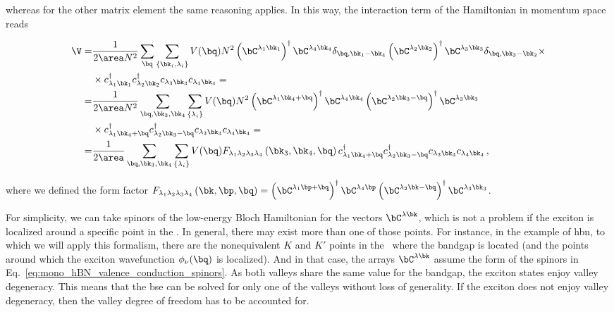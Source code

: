 \noindent whereas for the other matrix element the same reasoning applies.
In this way, the interaction term of the Hamiltonian in momentum space reads

\begin{align}
    \V  = & \frac{1}{2 \area N^{2}}\sum_{\bq}\sum_{\{\bk_{i},\lambda_{i}\}} V(\bq) N^{2} \left(\bC^{\lambda_1 \bk_1}\right)^{\dagger} \bC^{\lambda_4 \bk_4} \delta_{\bq,\bk_{1}-\bk_{4}} \left(\bC^{\lambda_2 \bk_2}\right)^{\dagger} \bC^{\lambda_3 \bk_3} \delta_{\bq,\bk_{3}-\bk_{2}} \times \\
          & \times  c^{\dagger}_{\lambda_1 \bk_1} c^{\dagger}_{\lambda_2 \bk_2} c_{\lambda_3 \bk_3} c_{\lambda_4 \bk_4} = \\
        = & \frac{1}{2 \area N^{2}}\sum_{\bq,\bk_{3},\bk_{4}} \sum_{\{\lambda_{i}\}}V(\bq) N^{2}\left(\bC^{\lambda_1 \bk_{4}+\bq}\right)^{\dagger} \bC^{\lambda_4 \bk_4}\left(\bC^{\lambda_2 \bk_{3}-\bq}\right)^{\dagger}\bC^{\lambda_3 \bk_3} \\
          & \times  c^{\dagger}_{\lambda_1 \bk_4 + \bq} c^{\dagger}_{\lambda_2 \bk_3 - \bq} c_{\lambda_3 \bk_3} c_{\lambda_4 \bk_4} = \\
        = & \frac{1}{2 \area}\sum_{\bq,\bk_{3},\bk_{4}}\sum_{\{\lambda_{i}\}} V(\bq) F_{\lambda_{1}\lambda_{2}\lambda_{3}\lambda_{4}}\left(\bk_{3},\bk_{4},\bq\right) c^{\dagger}_{\lambda_1 \bk_4 + \bq} c^{\dagger}_{\lambda_2 \bk_3 - \bq} c_{\lambda_3 \bk_3} c_{\lambda_4 \bk_4}\,,
\end{align}

\noindent where we defined the form factor $F_{\lambda_{1}\lambda_{2}\lambda_{3}\lambda_{4}} \left(\bk,\bp,\bq\right) = \left(\bC^{\lambda_{1} \bp+\bq}\right)^{\dagger}\bC^{\lambda_{4} \bp}\left(\bC^{\lambda_{2} \bk-\bq}\right)^{\dagger}\bC^{\lambda_3 \bk_{3}}$.

For simplicity, we can take spinors of the low-energy Bloch Hamiltonian for the vectors $\bC^{\lambda \bk}$, which is not a problem if the exciton is localized around a specific point in the \bz.
In general, there may exist more than one of those points.
For instance, in the example of \gls{hbn}, to which we will apply this formalism, there are the nonequivalent $K$ and $K'$ points in the \bz~where the bandgap is located (and the points around which the exciton wavefunction $\phi_{\nu} (\bq)$ is localized).
And in that case, the arrays $\bC^{\lambda \bk}$ assume the form of the spinors in Eq.~\eqref{eq:mono_hBN_valence_conduction_spinors}.
As both valleys share the same value for the bandgap, the exciton states enjoy valley degeneracy.
This means that the \gls{bse} can be solved for only one of the valleys without loss of generality.
If the exciton does not enjoy valley degeneracy, then the valley degree of freedom has to be accounted for.

